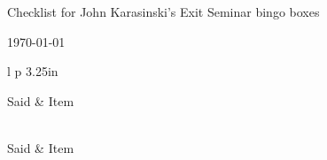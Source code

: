 \documentclass[12pt]{article}
\newcommand{\sep}{1mm}
\newcommand{\negsep}{-3mm}
\begin{document}
\begin{center}
\begin{Large}
Checklist for John Karasinski's Exit Seminar bingo boxes
\end{Large}
\vspace{0.15in}



\today

\end{center}

\begin{longtable}{l p {3.25in} }

Said  & Item \\[\sep]
\hline\\[\negsep]
\endfirsthead

Said  & Item \\[\sep]
\hline\\[\negsep]
\endhead

\hline\hline
\endfoot



\end{longtable}
\end{document}
